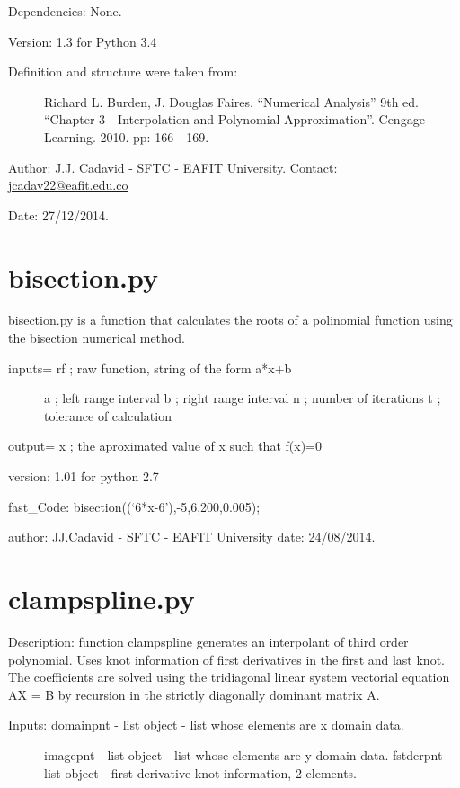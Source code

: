 \documentclass[letterpaper,10pt,oneside]{sphinxmanual}
\theoremstyle{plain}%
\theoremstyle{definition}%
\theoremstyle{remark}%
\begin{document}
Dependencies: None.

Version: 1.3 for Python 3.4
\begin{description}
\item[{Definition and structure were taken from:}] \leavevmode
Richard L. Burden, J. Douglas Faires. ``Numerical Analysis'' 9th ed.
``Chapter 3 - Interpolation and Polynomial Approximation''. 
Cengage Learning. 2010. pp: 166 - 169.

\end{description}

Author: J.J. Cadavid - SFTC - EAFIT University.
Contact: \href{mailto:jcadav22@eafit.edu.co}{jcadav22@eafit.edu.co}

Date: 27/12/2014.


\section{bisection.py}
\label{code:bisection-py}\label{code:module-bisection}
bisection.py is a function that calculates the roots of a polinomial function
using the bisection numerical method.
\begin{description}
\item[{inputs= rf ; raw function, string of the form a*x+b}] \leavevmode
a ; left range interval
b ; right range interval
n ; number of iterations
t ; tolerance of calculation

\end{description}

output= x ; the aproximated value of x such that f(x)=0

version: 1.01 for python 2.7

fast\_Code: bisection((`6*x-6'),-5,6,200,0.005);

author: JJ.Cadavid - SFTC - EAFIT University
date: 24/08/2014.


\section{clampspline.py}
\label{code:module-clampspline}\label{code:clampspline-py}
Description: function clampspline generates an interpolant of third order 
polynomial. Uses knot information of first derivatives in the first and last
knot. The coefficients are solved using the tridiagonal linear system 
vectorial equation AX = B by recursion in the strictly diagonally dominant 
matrix A.
\begin{description}
\item[{Inputs: domainpnt - list object - list whose elements are x domain data.}] \leavevmode
imagepnt - list object - list whose elements are y domain data.
fstderpnt - list object - first derivative knot information, 2 elements.

\end{description}
\end{document}
